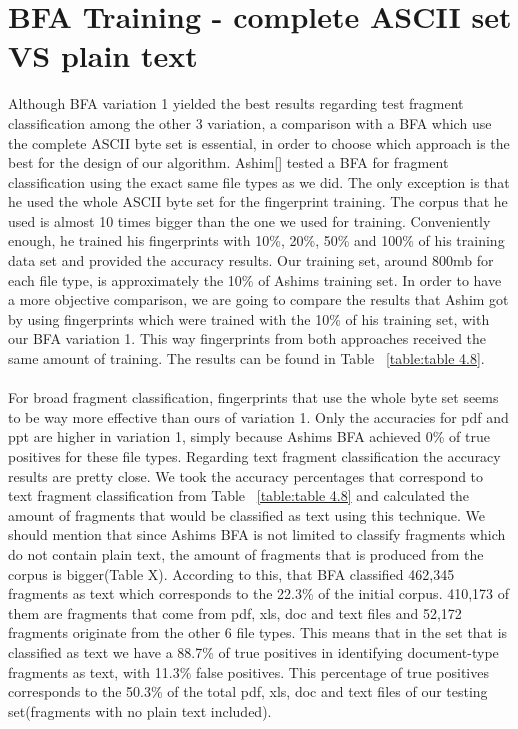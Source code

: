 \section{BFA Training - complete ASCII set VS plain text }
Although BFA variation 1 yielded the best results regarding test fragment classification among the other 3 variation, a comparison with a BFA which use the complete ASCII byte set is essential, in order to choose which approach is the best for the design of our algorithm. Ashim[] tested a BFA for fragment classification using the exact same file types as we did. The only exception is that he used the whole ASCII byte set for the fingerprint training. The corpus that he used is almost 10 times bigger than the one we used for training. Conveniently enough, he trained his fingerprints with 10\%, 20\%, 50\% and 100\% of his training data set and provided the accuracy results. Our training set, around 800mb for each file type, is approximately the 10\% of Ashims training set. In order to have a more objective comparison, we are going to compare the results that Ashim got by using fingerprints which were trained with the 10\% of his training set, with our BFA variation 1. This way fingerprints from both approaches received the same amount of training. The results can be found in Table ~\ref{table:table 4.8}.\\\\ 
  
 For broad fragment classification, fingerprints that use the whole byte set seems to be way more effective than ours of variation 1. Only the accuracies for pdf and ppt are higher in variation 1, simply because Ashims BFA achieved 0\% of true positives for these file types. Regarding text fragment classification the accuracy results are pretty close. We took the accuracy percentages that correspond to text fragment classification from Table ~\ref{table:table 4.8} and calculated the amount of fragments that would be classified as text using this technique. We should mention that since Ashims BFA is not limited to classify fragments which do not contain plain text, the amount of fragments that is produced from the corpus is bigger(Table X). According to this, that BFA classified 462,345 fragments as text which corresponds to the 22.3\% of the initial corpus. 410,173 of them are fragments that come from pdf, xls, doc and text files and 52,172 fragments originate from the other 6 file types. This means that in the set that is classified as text we have a 88.7\% of true positives in identifying document-type fragments as text, with 11.3\% false positives. This percentage of true positives corresponds to the 50.3\% of the total pdf, xls, doc and text files of our testing set(fragments with no plain text included).\\\\
 
